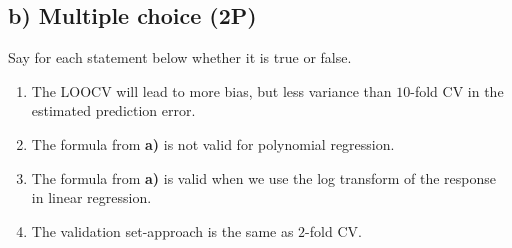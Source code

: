 \documentclass[
]{article}
\providecommand{\tightlist}{%
  \setlength{\itemsep}{0pt}\setlength{\parskip}{0pt}}
\begin{document}
\hypertarget{b-multiple-choice-2p}{%
\subsection{b) Multiple choice (2P)}\label{b-multiple-choice-2p}}

Say for each statement below whether it is true or false.

\begin{enumerate}
\def\labelenumi{(\roman{enumi})}
\tightlist
\item
  The LOOCV will lead to more bias, but less variance than \(10\)-fold
  CV in the estimated prediction error.
\item
  The formula from \textbf{a)} is not valid for polynomial regression.
\item
  The formula from \textbf{a)} is valid when we use the log transform of
  the response in linear regression.
\item
  The validation set-approach is the same as \(2\)-fold CV.
\end{enumerate}
\end{document}
